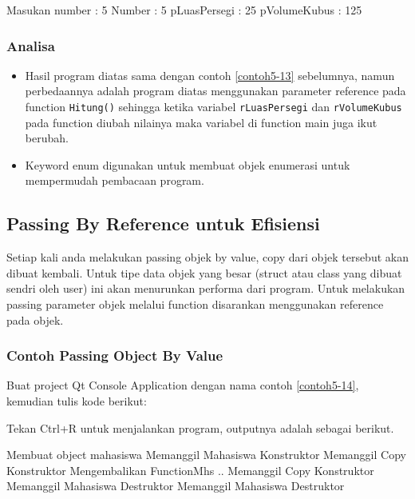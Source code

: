 \begin{lcverbatim}
Masukan number : 5
Number : 5
pLuasPersegi : 25
pVolumeKubus : 125
\end{lcverbatim}

\subsubsection*{Analisa}

\begin{itemize}

\item
  Hasil program diatas sama dengan contoh \ref{contoh5-13} sebelumnya, namun
  perbedaannya adalah program diatas menggunakan parameter reference
  pada function \texttt{Hitung()} sehingga ketika variabel
  \texttt{rLuasPersegi} dan \texttt{rVolumeKubus} pada function diubah
  nilainya maka variabel di function main juga ikut berubah.
\item
  Keyword enum digunakan untuk membuat objek enumerasi untuk mempermudah
  pembacaan program.
\end{itemize}

\subsection{Passing By Reference untuk Efisiensi}\label{passing-by-reference-untuk-efisiensi}

Setiap kali anda melakukan passing objek by value, copy dari objek
tersebut akan dibuat kembali. Untuk tipe data objek yang besar (struct
atau class yang dibuat sendri oleh user) ini akan menurunkan performa
dari program. Untuk melakukan passing parameter objek melalui function
disarankan menggunakan reference pada objek.

\subsubsection*{Contoh  Passing Object By Value}

Buat project Qt Console Application dengan nama contoh \ref{contoh5-14}, kemudian
tulis kode berikut:



Tekan Ctrl+R untuk menjalankan program, outputnya adalah sebagai
berikut.

\begin{lcverbatim}
Membuat object mahasiswa
Memanggil Mahasiswa Konstruktor
Memanggil Copy Konstruktor
Mengembalikan FunctionMhs ..
Memanggil Copy Konstruktor
Memanggil Mahasiswa Destruktor
Memanggil Mahasiswa Destruktor
\end{lcverbatim}

